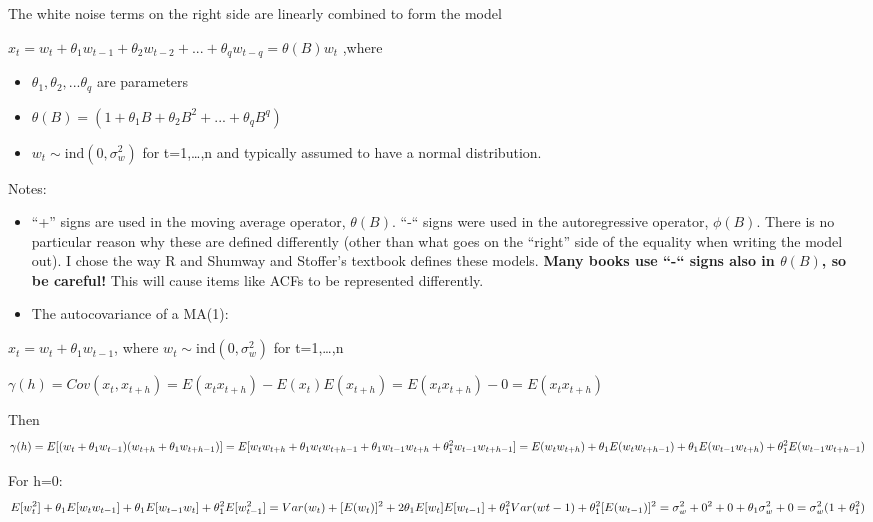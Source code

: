 \documentclass[
]{book}
\providecommand{\tightlist}{%
  \setlength{\itemsep}{0pt}\setlength{\parskip}{0pt}}
\theoremstyle{definition}
\theoremstyle{definition}
\theoremstyle{definition}
\theoremstyle{definition}
\theoremstyle{remark}
\begin{document}
The white noise terms on the right side are linearly combined to form the model

\(x_t=w_t+\theta_1w_{t-1}+\theta_2w_{t-2}+...+\theta_qw_{t-q}=\theta(B)w_t\) ,where

\begin{itemize}
\tightlist
\item
  \(\theta_1,\theta_2,...\theta_q\) are parameters
\item
  \(\theta(B)=(1+\theta_1B+\theta_2B^2+...+\theta_qB^q)\)
\item
  \(w_t\sim \mathrm{ind}(0,\sigma^2_w)\) for t=1,\ldots,n and typically assumed to have a normal distribution.
\end{itemize}

Notes:

\begin{itemize}
\item
  ``+'' signs are used in the moving average operator, \(\theta(B)\). ``-`` signs were used in the autoregressive operator, \(\phi(B)\). There is no particular reason why these are defined differently (other than what goes on the ``right'' side of the equality when writing the model out). I chose the way R and Shumway and Stoffer's textbook defines these models. \textbf{Many books use ``-`` signs also in \(\theta(B)\), so be careful!} This will cause items like ACFs to be represented differently.
\item
  The autocovariance of a MA(1):
\end{itemize}

\(x_t=w_t+\theta_1w_{t-1}\), where \(w_t \sim \mathrm{ind}(0, \sigma^2_w)\) for t=1,\ldots,n

\(\gamma(h)=Cov(x_t,x_{t+h})=E(x_tx_{t+h})-E(x_t)E(x_{t+h})=E(x_tx_{t+h})-0=E(x_tx_{t+h})\)

Then\[\gamma(h)=E[(w_t+\theta_1w_{t-1})(w_{t+h}+\theta_1w_{t+h-1})]\\
=E[w_tw_{t+h}+\theta_1w_tw_{t+h-1}+\theta_1w_{t-1}w_{t+h}+\theta_1^2w_{t-1}w_{t+h-1}]\\
=E(w_tw_{t+h})+\theta_1E(w_tw_{t+h-1})+\theta_1E(w_{t-1}w_{t+h})+\theta_1^2E(w_{t-1}w_{t+h-1})\]

For h=0:
\[E[w_t^2] + \theta_1E[w_tw_{t-1}] + \theta_1E[w_{t-1}w_t] + \theta_1^2E[w_{t-1}^2]\\
= Var(w_t) + [E(w_t)]^2 + 2\theta_1E[w_t]E[w_{t-1}] + \theta_1^2Var(wt-1) +\theta_1^2[E(w_{t-1})]^2\\
= \sigma_w^2 + 0^2 + 0 +  \theta_1\sigma^2_w +  0\\
=  \sigma_w^2(1+ \theta_1^2)\]
\end{document}
